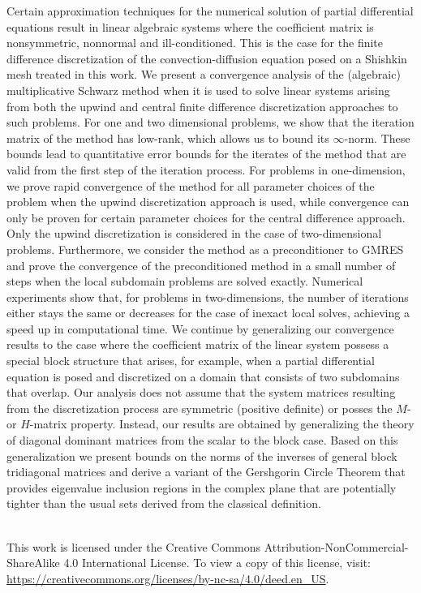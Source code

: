 
Certain approximation techniques for the numerical solution of partial
differential equations result in linear algebraic systems where the coefficient
matrix is nonsymmetric, nonnormal and ill-conditioned. This is the case for the finite difference discretization of the convection-diffusion equation posed on a Shishkin mesh treated in this work. We present a convergence analysis of the (algebraic) multiplicative Schwarz method when it is used to solve linear systems arising from both the upwind and central finite difference discretization approaches to such problems. For one and two dimensional problems, we show that the iteration matrix of the method has
low-rank, which allows us to bound its $\infty$-norm. These bounds lead to
quantitative error bounds for the iterates of the method that
are valid from the first step of the iteration process. For problems in
one-dimension, we prove rapid convergence of the method for all parameter choices of the problem when the upwind discretization approach is used, while convergence can only be proven for certain parameter choices for the central difference approach.
Only the upwind discretization is considered in the case of two-dimensional problems.
Furthermore, we consider the method as a preconditioner to GMRES and prove the
convergence of the preconditioned method in a small number of steps when the
local subdomain problems are solved exactly. Numerical experiments show that,
for problems in two-dimensions, the number of iterations either stays the same
or decreases for the case of inexact local solves, achieving a speed up in
computational time.
We continue by generalizing our convergence results to the case
where the coefficient matrix of the linear system possess a special block
structure that arises, for example, when a partial differential equation is
posed and discretized on a domain that consists of two subdomains that overlap.
Our analysis does not assume that the system matrices resulting from the
discretization process are symmetric (positive definite) or posses the $M$- or
$H$-matrix property. Instead, our results are obtained by generalizing the
theory of diagonal dominant matrices from the scalar to the block case.
Based on this generalization we present bounds on the norms of the inverses of
general block tridiagonal matrices and derive a variant of the Gershgorin
Circle Theorem that provides eigenvalue inclusion regions in the complex plane
that are potentially tighter than the usual sets derived from the classical
definition.

\vfill

\begin{center}
  \ccbyncsa\\
  \footnotesize
  This work is licensed under the Creative Commons
  Attribution-NonCommercial-ShareAlike 4.0 International License. To view a copy of this
  license, visit:
  \url{https://creativecommons.org/licenses/by-nc-sa/4.0/deed.en_US}.
\end{center}
\afterpage{\blankpage}
